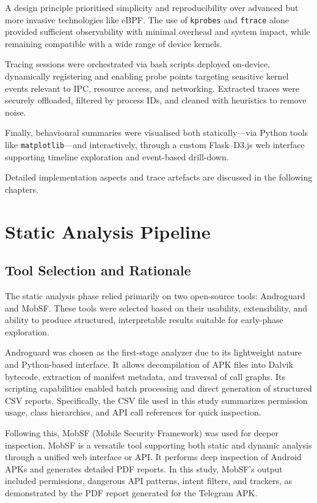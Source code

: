 \documentclass[a4paper,12pt]{report}
\begin{document}
A design principle prioritised simplicity and reproducibility over advanced but more invasive technologies like eBPF. The use of \texttt{kprobes} and \texttt{ftrace} alone provided sufficient observability with minimal overhead and system impact, while remaining compatible with a wide range of device kernels.

Tracing sessions were orchestrated via bash scripts deployed on-device, dynamically registering and enabling probe points targeting sensitive kernel events relevant to IPC, resource access, and networking. Extracted traces were securely offloaded, filtered by process IDs, and cleaned with heuristics to remove noise.

Finally, behavioural summaries were visualised both statically—via Python tools like \texttt{matplotlib}—and interactively, through a custom Flask–D3.js web interface supporting timeline exploration and event-based drill-down.

Detailed implementation aspects and trace artefacts are discussed in the following chapters.

\section{Static Analysis Pipeline}

\subsection{Tool Selection and Rationale}

The static analysis phase relied primarily on two open-source tools: Androguard and MobSF. These tools were selected based on their usability, extensibility, and ability to produce structured, interpretable results suitable for early-phase exploration.

Androguard was chosen as the first-stage analyzer due to its lightweight nature and Python-based interface. It allows decompilation of APK files into Dalvik bytecode, extraction of manifest metadata, and traversal of call graphs. Its scripting capabilities enabled batch processing and direct generation of structured CSV reports. Specifically, the CSV file used in this study summarizes permission usage, class hierarchies, and API call references for quick inspection.

Following this, MobSF (Mobile Security Framework) was used for deeper inspection. MobSF is a versatile tool supporting both static and dynamic analysis through a unified web interface or API. It performs deep inspection of Android APKs and generates detailed PDF reports. In this study, MobSF's output included permissions, dangerous API patterns, intent filters, and trackers, as demonstrated by the PDF report generated for the Telegram APK.
\end{document}
